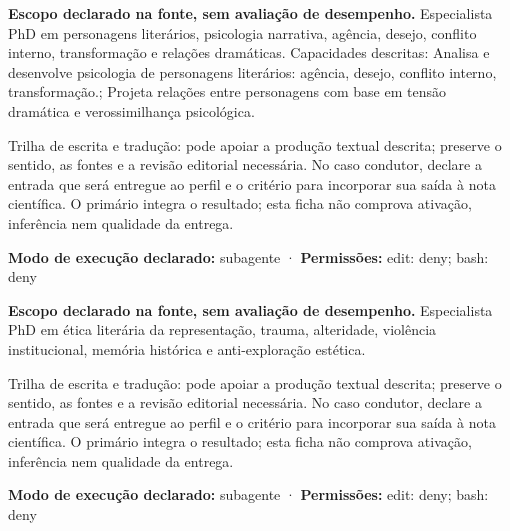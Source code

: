 \begin{descricao}
\textbf{Escopo declarado na fonte, sem avaliação de desempenho.}
Especialista PhD em personagens literários, psicologia narrativa, agência, desejo, conflito interno, transformação e relações dramáticas. Capacidades descritas: Analisa e desenvolve psicologia de personagens literários: agência, desejo, conflito interno, transformação.; Projeta relações entre personagens com base em tensão dramática e verossimilhança psicológica.
\end{descricao}

\begin{funcao}
Trilha de escrita e tradução: pode apoiar a produção textual descrita; preserve o sentido, as fontes e a revisão editorial necessária. No caso condutor, declare a entrada que será entregue ao perfil e o critério para incorporar sua saída à nota científica. O primário integra o resultado; esta ficha não comprova ativação, inferência nem qualidade da entrega.
\end{funcao}

\begin{arquitetura}
\textbf{Modo de execução declarado:} subagente · \textbf{Permissões:} edit: deny; bash: deny
\end{arquitetura}


\begin{descricao}
\textbf{Escopo declarado na fonte, sem avaliação de desempenho.}
Especialista PhD em ética literária da representação, trauma, alteridade, violência institucional, memória histórica e anti-exploração estética.
\end{descricao}

\begin{funcao}
Trilha de escrita e tradução: pode apoiar a produção textual descrita; preserve o sentido, as fontes e a revisão editorial necessária. No caso condutor, declare a entrada que será entregue ao perfil e o critério para incorporar sua saída à nota científica. O primário integra o resultado; esta ficha não comprova ativação, inferência nem qualidade da entrega.
\end{funcao}

\begin{arquitetura}
\textbf{Modo de execução declarado:} subagente · \textbf{Permissões:} edit: deny; bash: deny
\end{arquitetura}

